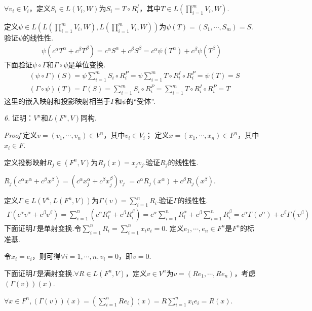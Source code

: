 \(\forall v_i \in V_i\)，定义\(S_i \in L(V_i,W)\)为\(S_i=T \circ R_i^I\)，其中\(T \in L(\prod_{i=1}^m V_i,W)\).

定义\(\psi \in L(L(\prod_{i=1}^m V_i,W),L(\prod_{i=1}^m V_i,W))\)为\(\psi(T)=(S_1,\cdots,S_m)=S\).验证\(\psi\)的线性性.
    \begin{align*}
        \psi(c^\alpha T^\alpha+c^\beta T^\beta)=c^\alpha S^\alpha+c^\beta S^\beta
        =c^\alpha \psi(T^\alpha)+c^\beta \psi(T^\beta)
    \end{align*}
下面验证\(\psi \circ \Gamma\)和\(\Gamma \circ \psi\)是单位变换.
    \begin{align*}
        &(\psi \circ \Gamma)(S)=\psi \sum_{i=1}^m S_i \circ R_i^P
        =\psi \sum_{i=1}^m T \circ R_i^I \circ R_i^P=\psi(T)=S \\
        &(\Gamma \circ \psi)(T)=\Gamma(S)=\sum_{i=1}^m S_i \circ R_i^P
        =\sum_{i=1}^m T \circ R_i^I \circ R_i^P=T
    \end{align*}
这里的嵌入映射和投影映射相当于\(\Gamma\)和\(\psi\)的“受体”.

\newpage

\textit{6.}
证明：\(V^n\)和\(L(F^n,V)\)同构.

\textit{Proof}
定义\(v=(v_1,\cdots,v_n) \in V^n\)，其中\(v_i \in V_i\)；
定义\(x=(x_1,\cdots,x_n) \in F^n\)，其中\(x_i \in F\).

定义投影映射\(R_j \in (F^n,V)\)为\(R_j(x)=x_jv_j\).验证\(R_j\)的线性性.

\(R_j(c^\alpha x^\alpha+c^\beta x^\beta)=(c^\alpha x_j^\alpha+c^\beta x_j^\beta)v_j\)
\(=c^\alpha R_j(x^\alpha)+c^\beta R_j(x^\beta)\).

定义\(\Gamma \in L(V^n,L(F^n,V))\)为\(\Gamma(v)=\sum_{i=1}^n R_i\).验证\(\Gamma\)的线性性.
    \begin{align*}
        \Gamma(c^\alpha v^\alpha+c^\beta v^\beta)
        =\sum_{i=1}^n (c^\alpha R_i^\alpha+c^\beta R_i^\beta)
        =c^\alpha \sum_{i=1}^n R_i^\alpha+c^\beta \sum_{i=1}^n R_i^\beta
        =c^\alpha \Gamma(v^\alpha)+c^\beta \Gamma(v^\beta)
    \end{align*}
下面证明\(\Gamma\)是单射变换.令\(\sum_{i=1}^n R_i=\sum_{i=1}^n x_iv_i=0\).
定义\(e_1,\cdots,e_n \in F^n\)是\(F^n\)的标准基.

令\(x_i=e_i\)，则可得\(\forall i=1,\cdots,n,v_i=0\)，即\(v=0\).

下面证明\(\Gamma\)是满射变换.\(\forall R \in L(F^n,V)\)，定义\(v \in V^n\)为\(v=(Re_1,\cdots,Re_n)\)，考虑\((\Gamma(v))(x)\).

\(\forall x \in F^n,(\Gamma(v))(x)=(\sum_{i=1}^n Re_i)(x)=R\sum_{i=1}^n x_ie_i=R(x)\).

